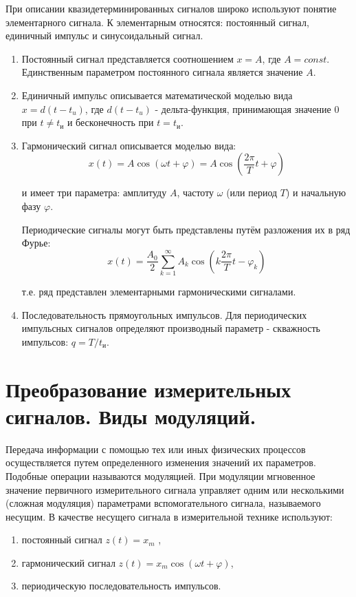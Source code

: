 \documentclass[unicode, 12pt, a4paper, oneside]{article}
\begin{document}
При описании квазидетерминированных сигналов широко используют понятие элементарного сигнала. 
К элементарным относятся: постоянный сигнал, единичный импульс и синусоидальный сигнал.
\begin{enumerate}
\item Постоянный сигнал представляется соотношением $x = A$, где $A = const$. Единственным параметром постоянного сигнала является значение $A$.
\item Единичный импульс описывается математической моделью вида $x=d(t-t_u)$,
где $d(t-t_u)$ - дельта-функция, принимающая значение 0 при $t \neq t_\text{и}$ и бесконечность при $t=t_\text{и}$.
\item Гармонический сигнал описывается моделью вида: 
\begin{displaymath}
x(t)= A\cos (\omega t+\varphi)=A\cos (\frac{2\pi}{T} t+\varphi)
\end{displaymath}

и имеет три параметра: амплитуду $A$, частоту $\omega$ (или период $T$) и начальную фазу $\varphi$.

Периодические сигналы могут быть представлены путём разложения их в ряд Фурье:
\begin{displaymath}
x(t)= \frac{A_0}{2} \sum_{k=1}^{\infty} A_k\cos (k \frac{2\pi}{T} t-\varphi_k)
\end{displaymath}

т.е. ряд представлен элементарными гармоническими сигналами.
\item Последовательность прямоугольных импульсов. Для периодических импульсных сигналов определяют производный параметр - скважность импульсов: $q=T/t_\text{и}$.
\end{enumerate}

\section{Преобразование измерительных сигналов. Виды модуляций.}

Передача информации с помощью тех или иных физических процессов осуществляется путем определенного изменения значений их параметров. Подобные операции называются модуляцией. При модуляции мгновенное значение первичного измерительного сигнала управляет одним или несколькими (сложная модуляция) параметрами вспомогательного сигнала, называемого несущим. В качестве несущего сигнала в измерительной технике используют:
\begin{enumerate}
\item постоянный сигнал $z(t) = x_m$ ,
\item гармонический сигнал $z(t) = x_m \cos (\omega t + \varphi)$,
\item периодическую последовательность импульсов.
\end{enumerate}
\end{document}
